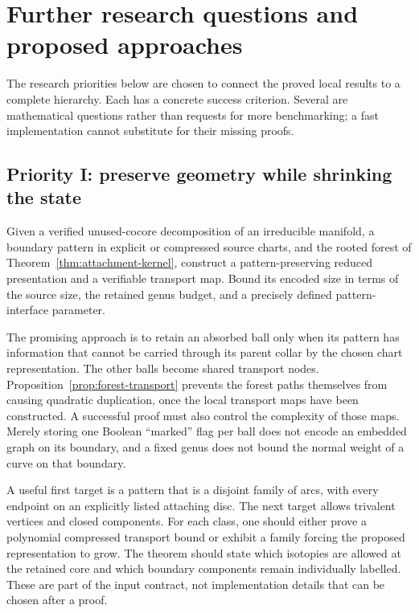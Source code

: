 \section{Further research questions and proposed approaches}
\label{sec:research-program}

The research priorities below are chosen to connect the proved local
results to a complete hierarchy.  Each has a concrete success criterion.
Several are mathematical questions rather than requests for more
benchmarking; a fast implementation cannot substitute for their missing
proofs.

\subsection{Priority I: preserve geometry while shrinking the state}

\begin{problem}
\label{prob:patterned-balls}
Given a verified unused-cocore decomposition of an irreducible manifold,
a boundary pattern in explicit or compressed source charts, and the
rooted forest of Theorem~\ref{thm:attachment-kernel}, construct a
pattern-preserving reduced presentation and a verifiable transport map.
Bound its encoded size in terms of the source size, the retained genus
budget, and a precisely defined pattern-interface parameter.
\end{problem}

The promising approach is to retain an absorbed ball only when its pattern
has information that cannot be carried through its parent collar by the
chosen chart representation.  The other balls become shared transport
nodes.  Proposition~\ref{prop:forest-transport} prevents the forest paths
themselves from causing quadratic duplication, once the local transport
maps have been constructed.  A successful proof must also control the
complexity of those maps.  Merely storing one Boolean ``marked'' flag per
ball does not encode an embedded graph on its boundary, and a fixed genus
does not bound the normal weight of a curve on that boundary.

A useful first target is a pattern that is a disjoint family of arcs,
with every endpoint on an explicitly listed attaching disc.  The next
target allows trivalent vertices and closed components.  For each class,
one should either prove a polynomial compressed transport bound or exhibit
a family forcing the proposed representation to grow.  The theorem should
state which isotopies are allowed at the retained core and which boundary
components remain individually labelled.  These are part of the input
contract, not implementation details that can be chosen after a proof.

